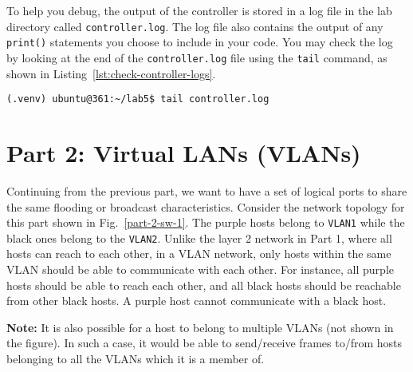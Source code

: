 \documentclass[11pt]{article}
\begin{document}

To help you debug, the output of the controller is stored in a log file in the lab directory called \texttt{controller.log}.
The log file also contains the output of any \texttt{print()} statements you choose to include in your code.
You may check the log by looking at the end of the \texttt{controller.log} file using the \texttt{tail} command, as shown in Listing~\ref{lst:check-controller-logs}.

\begin{lstlisting}[style=ece361shell, caption={Checking the last few lines of the controller's output log file.}, label={lst:check-controller-logs}]
(.venv) ubuntu@361:~/lab5$ tail controller.log
\end{lstlisting}



\section{Part 2: Virtual LANs (VLANs)}
\label{sec:exercise2}

Continuing from the previous part, we want to have a set of logical ports to share the same flooding or broadcast characteristics.
Consider the network topology for this part shown in Fig.~\ref{part-2-sw-1}.
The purple hosts belong to \texttt{VLAN1} while the black ones belong to the \texttt{VLAN2}.
Unlike the layer 2 network in Part 1, where all hosts can reach to each other, in a VLAN network, only hosts within the same VLAN should be able to communicate with each other.
For instance, all purple hosts should be able to reach each other, and all black hosts should be reachable from other black hosts.
A purple host cannot communicate with a black host.

\textbf{Note:} It is also possible for a host to belong to multiple VLANs (not shown in the figure).
In such a case, it would be able to send/receive frames to/from hosts belonging to all the VLANs which it is a member of.
\end{document}
